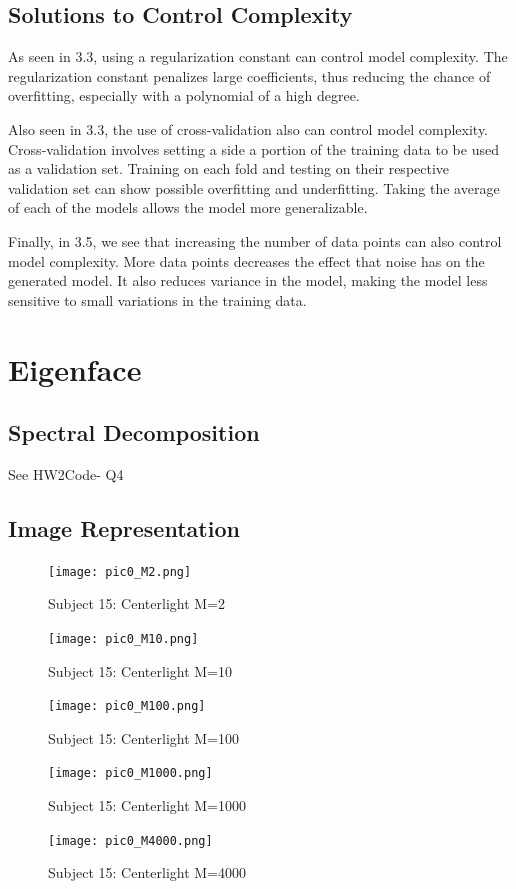 \documentclass{article}
\begin{document}
\subsection{Solutions to Control Complexity}
As seen in 3.3, using a regularization constant can control model complexity. The regularization constant penalizes large coefficients, thus reducing the chance of overfitting, especially with a polynomial of a high degree.

Also seen in 3.3, the use of cross-validation also can control model complexity. Cross-validation involves setting a side a portion of the training data to be used as a validation set. Training on each fold and testing on their respective validation set can show possible overfitting and underfitting. Taking the average of each of the models allows the model more generalizable.

Finally, in 3.5, we see that increasing the number of data points can also control model complexity. More data points decreases the effect that noise has on the generated model. It also reduces variance in the model, making the model less sensitive to small variations in the training data.

\newpage
\section{Eigenface}
\subsection{Spectral Decomposition}

See HW2Code- Q4

\subsection{Image Representation}

\begin{figure}[!htb]
   \begin{minipage}{0.48\textwidth}
     \centering
      \texttt{[image: pic0\_M2.png]}
    \caption{Subject 15: Centerlight M=2}
   \end{minipage}\hfill
   \begin{minipage}{0.48\textwidth}
     \centering
     \texttt{[image: pic0\_M10.png]}
     \caption{Subject 15: Centerlight M=10}
   \end{minipage}
   \begin{minipage}{0.48\textwidth}
     \centering
     \texttt{[image: pic0\_M100.png]}
     \caption{Subject 15: Centerlight M=100}
   \end{minipage}
   \begin{minipage}{0.48\textwidth}
     \centering
     \texttt{[image: pic0\_M1000.png]}
     \caption{Subject 15: Centerlight M=1000}
   \end{minipage}
   \begin{minipage}{0.48\textwidth}
     \centering
     \texttt{[image: pic0\_M4000.png]}
     \caption{Subject 15: Centerlight M=4000}
   \end{minipage}
\end{figure}
\end{document}
